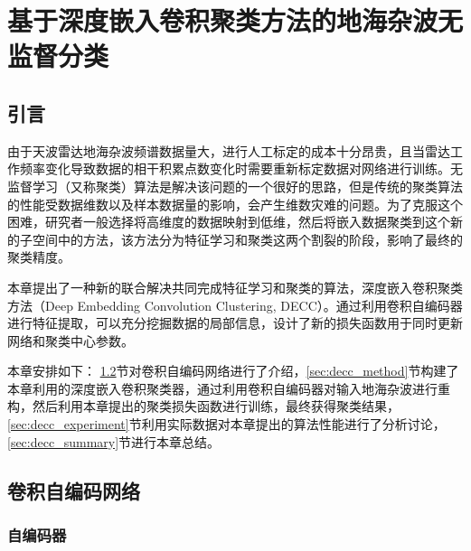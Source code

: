 
\chapter{基于深度嵌入卷积聚类方法的地海杂波无监督分类}
\label{sec:decc}
\section{引言}
由于天波雷达地海杂波频谱数据量大，进行人工标定的成本十分昂贵，且当雷达工作频率变化导致数据的相干积累点数变化时需要重新标定数据对网络进行训练。无监督学习（又称聚类）算法是解决该问题的一个很好的思路，但是传统的聚类算法的性能受数据维数以及样本数据量的影响，会产生维数灾难的问题。为了克服这个困难，研究者一般选择将高维度的数据映射到低维，然后将嵌入数据聚类到这个新的子空间中的方法，该方法分为特征学习和聚类这两个割裂的阶段，影响了最终的聚类精度。

本章提出了一种新的联合解决共同完成特征学习和聚类的算法，深度嵌入卷积聚类方法（Deep Embedding Convolution Clustering, DECC）。通过利用卷积自编码器进行特征提取，可以充分挖掘数据的局部信息，设计了新的损失函数用于同时更新网络和聚类中心参数。


本章安排如下： \ref{sec:cae}节对卷积自编码网络进行了介绍，\ref{sec:decc_method}节构建了本章利用的深度嵌入卷积聚类器，通过利用卷积自编码器对输入地海杂波进行重构，然后利用本章提出的聚类损失函数进行训练，最终获得聚类结果，\ref{sec:decc_experiment}节利用实际数据对本章提出的算法性能进行了分析讨论，\ref{sec:decc_summary}节进行本章总结。

\section{卷积自编码网络}
\label{sec:cae}
\subsection{自编码器}


